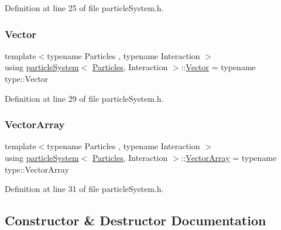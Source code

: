 Definition at line 25 of file particle\+System.\+h.

\mbox{\label{classparticle_system_a76c99c2b05db108a24c6e6ccbbd93af1}} 
\subsubsection{\texorpdfstring{Vector}{Vector}}
{\footnotesize\ttfamily template$<$typename Particles , typename Interaction $>$ \\
using \mbox{\hyperlink{classparticle_system}{particle\+System}}$<$ \mbox{\hyperlink{struct_particles}{Particles}}, Interaction $>$\+::\mbox{\hyperlink{classparticle_system_a76c99c2b05db108a24c6e6ccbbd93af1}{Vector}} =  typename type\+::\+Vector}



Definition at line 29 of file particle\+System.\+h.

\mbox{\label{classparticle_system_ac8049667a0d05e76b836642503a71c12}} 
\subsubsection{\texorpdfstring{Vector\+Array}{VectorArray}}
{\footnotesize\ttfamily template$<$typename Particles , typename Interaction $>$ \\
using \mbox{\hyperlink{classparticle_system}{particle\+System}}$<$ \mbox{\hyperlink{struct_particles}{Particles}}, Interaction $>$\+::\mbox{\hyperlink{classparticle_system_ac8049667a0d05e76b836642503a71c12}{Vector\+Array}} =  typename type\+::\+Vector\+Array}



Definition at line 31 of file particle\+System.\+h.



\subsection{Constructor \& Destructor Documentation}
\mbox{\label{classparticle_system_a56d066b7151be7bdb05f64349d44581e}} 
